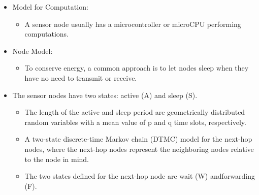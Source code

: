 \documentclass[11pt]{beamer}
\begin{document}
						 	\begin{frame}
						 		\begin{itemize}
						 
						 
						 	\item Model for Computation:
						 	\begin{itemize}
						 		\item
						 		A sensor node usually has a microcontroller or microCPU performing computations.
						 	\end{itemize}
						 	\item Node Model:
						 	\begin{itemize}
						 		\item To conserve energy, a common approach is to let nodes sleep when they have no need to transmit or receive.
						 	\end{itemize}
						 	\item The sensor nodes have two states: active (A) and sleep (S).
						 	\begin{itemize}
						 		\item The length of the active and sleep period are geometrically distributed random variables with a mean value of p and q time slots, respectively.
						 	\item A two-state discrete-time Markov chain (DTMC) model for the next-hop nodes, where the next-hop nodes represent the neighboring nodes relative to the node in mind.
						 	\item The two states defined for the next-hop node are wait (W) andforwarding (F).
						 \end{itemize}
						\end{itemize}
				\end{frame}
\end{document}
